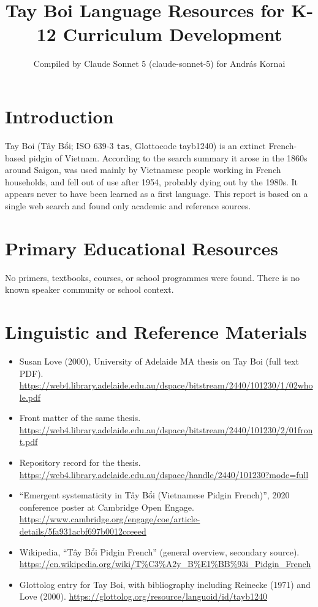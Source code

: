 \documentclass[12pt]{article}
\title{Tay Boi Language Resources for K-12 Curriculum Development}
\author{Compiled by Claude Sonnet 5 (claude-sonnet-5) for Andr\'as Kornai}
\date{}
\begin{document}
\maketitle

\section{Introduction}
Tay Boi (T\^ay B\h{\^o}i; ISO 639-3 \texttt{tas}, Glottocode tayb1240) is an extinct French-based pidgin of Vietnam. According to the search summary it arose in the 1860s around Saigon, was used mainly by Vietnamese people working in French households, and fell out of use after 1954, probably dying out by the 1980s. It appears never to have been learned as a first language. This report is based on a single web search and found only academic and reference sources.

\section{Primary Educational Resources}
No primers, textbooks, courses, or school programmes were found. There is no known speaker community or school context.

\section{Linguistic and Reference Materials}
\begin{itemize}
\item Susan Love (2000), University of Adelaide MA thesis on Tay Boi (full text PDF). \url{https://web4.library.adelaide.edu.au/dspace/bitstream/2440/101230/1/02whole.pdf}
\item Front matter of the same thesis. \url{https://web4.library.adelaide.edu.au/dspace/bitstream/2440/101230/2/01front.pdf}
\item Repository record for the thesis. \url{https://web4.library.adelaide.edu.au/dspace/handle/2440/101230?mode=full}
\item ``Emergent systematicity in T\^ay B\h{\^o}i (Vietnamese Pidgin French)'', 2020 conference poster at Cambridge Open Engage. \url{https://www.cambridge.org/engage/coe/article-details/5fa931acbf697b0012cceeed}
\item Wikipedia, ``T\^ay B\h{\^o}i Pidgin French'' (general overview, secondary source). \url{https://en.wikipedia.org/wiki/T%C3%A2y_B%E1%BB%93i_Pidgin_French}
\item Glottolog entry for Tay Boi, with bibliography including Reinecke (1971) and Love (2000). \url{https://glottolog.org/resource/languoid/id/tayb1240}
\end{itemize}
\end{document}
